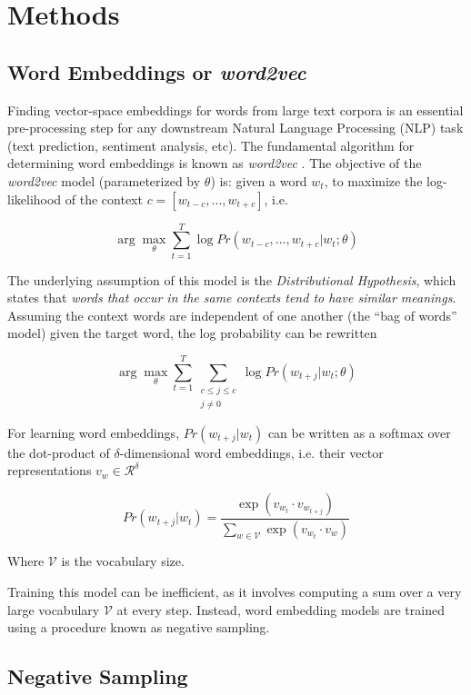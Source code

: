 \section{Methods}

\subsection{Word Embeddings or \textit{word2vec}}

Finding vector-space embeddings for words from large text corpora is an essential pre-processing step for any downstream Natural Language Processing (NLP) task (text prediction, sentiment analysis, etc). The fundamental algorithm for determining word embeddings is known as \textit{word2vec} \cite{Mikolov}. The objective of the \textit{word2vec} model (parameterized by $\theta$) is: given a word $w_t$, to maximize the log-likelihood of the context $c = [w_{t-c}, ... , w_{t+c}]$, i.e.

$$
\arg\max_\theta \sum_{t=1}^T \log Pr(w_{t-c}, ... , w_{t+c} | w_t ; \theta)
$$

The underlying assumption of this model is the \textit{Distributional Hypothesis}, which states that \textit{words that occur in the same contexts tend to have similar meanings}. Assuming the context words are independent of one another (the ``bag of words'' model) given the target word, the log probability can be rewritten

$$
\arg\max_\theta \sum_{t=1}^T \sum_{\substack{c \le j \le c \\ j \ne 0}} \log Pr(w_{t+j} | w_t ; \theta)
$$

For learning word embeddings, $Pr(w_{t+j} | w_t)$ can be written as a softmax over the dot-product of $\delta$-dimensional word embeddings, i.e. their vector representations $v_w \in \mathcal{R^\delta}$

$$
Pr(w_{t+j} | w_t) = \dfrac{\exp(v_{w_t} \cdot v_{w_{t+j}})}{\sum_{w\in\mathcal{V}} \exp(v_{w_t} \cdot v_{w})}
$$

Where $\mathcal{V}$ is the vocabulary size.

Training this model can be inefficient, as it involves computing a sum over a very large vocabulary $\mathcal{V}$ at every step. Instead, word embedding models are trained using a procedure known as negative sampling.

\subsection{Negative Sampling}

